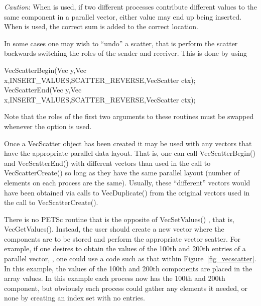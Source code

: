 {\em Caution}: When  is used, if two different
processes contribute different values to the same component in a
parallel vector, either value may end up being inserted. When  is used, the correct sum is added to the correct
location.

In some cases one may wish to ``undo'' a scatter, that is perform the 
scatter backwards switching the roles of the sender and receiver. This is 
done by using 
\begin{tabbing}
  VecScatterBegin(Vec y,Vec x,INSERT\_VALUES,SCATTER\_REVERSE,VecScatter ctx);\\
  VecScatterEnd(Vec y,Vec x,INSERT\_VALUES,SCATTER\_REVERSE,VecScatter ctx);
\end{tabbing} 
 Note that the roles of the first 
two arguments to these routines must be swapped whenever the 
option is used.

Once a VecScatter object has been created it may be used with any vectors
that have the appropriate parallel data layout. That is, one can call 
VecScatterBegin() and VecScatterEnd() with different vectors than 
used in the call to VecScatterCreate() so long as they have the same 
parallel layout (number of elements on each process are the same). Usually,
these ``different'' vectors would have been obtained via calls to 
VecDuplicate() from the original vectors used in the call to 
VecScatterCreate().

 
There is no PETSc routine that is the opposite of VecSetValues()
, that is, VecGetValues(). 
Instead, the user should create a new vector where
the components are to be stored and perform the appropriate vector 
scatter. For example, if one desires to obtain the values of the 
100th and 200th entries of a parallel vector, , one could use 
a code such as that within Figure~\ref{fig_vecscatter}.
In this example, the values of the 100th and 200th components are
placed in the array 
values. In this example each process now has the 100th and 
200th component, but obviously each process could gather any 
elements it needed, or none by creating an index set with no entries.

